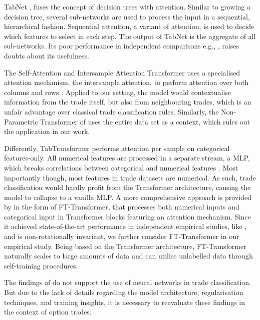 TabNet \autocite[][3--5]{arikTabnetAttentiveInterpretable2020}, fuses the concept of decision trees with attention. Similar to growing a decision tree, several sub-networks are used to process the input in a sequential, hierarchical fashion. Sequential attention, a variant of attention, is used to decide which features to select in each step. The output of TabNet is the aggregate of all sub-networks. Its poor performance in independent comparisons e.g., \textcites[][7]{kadraWelltunedSimpleNets2021}[][7]{gorishniyRevisitingDeepLearning2021}, raises doubts about its usefulness.

The Self-Attention and Intersample Attention Transformer uses a specialised attention mechanism, the intersample attention, to perform attention over both columns and rows \autocite[][4--5]{somepalliSaintImprovedNeural2021}. Applied to our setting, the model would contextualise information from the trade itself, but also from neighbouring trades, which is an unfair advantage over classical trade classification rules. Similarly, the Non-Parametric Transformer of \textcite[][3--4]{kossenSelfAttentionDatapointsGoing2021} uses the entire data set as a context, which rules out the application in our work.

Differently, TabTransformer \autocite[][2--3]{huangTabTransformerTabularData2020} performs attention per sample on categorical features-only. All numerical features are processed in a separate stream, a \gls{MLP}, which breaks correlations between categorical and numerical features \autocite[][2]{somepalliSaintImprovedNeural2021}. Most importantly though, most features in trade datasets are numerical. As such, trade classification would hardly profit from the Transformer architecture, causing the model to collapse to a vanilla \gls{MLP}. A more comprehensive approach is provided by \textcite[][4--5]{gorishniyRevisitingDeepLearning2021} in the form of FT-Transformer, that processes both numerical inputs and categorical input in Transformer blocks featuring an attention mechanism. Since it achieved state-of-the-art performance in independent empirical studies, like \textcite[][5]{grinsztajnWhyTreebasedModels2022}, and is non-rotationally invariant, we further consider FT-Transformer in our empirical study. Being based on the Transformer architecture, FT-Transformer naturally scales to large amounts of data and can utilise unlabelled data through self-training procedures.

The findings of \textcite[][50]{ronenMachineLearningTrade2022} do not support the use of neural networks in trade classification. But due to the lack of details regarding the model architecture, regularisation techniques, and training insights, it is necessary to reevaluate these findings in the context of option trades.

